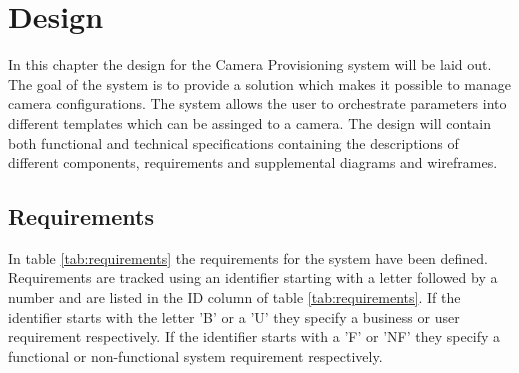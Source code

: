 \chapter{Design}
\label{sec:design}
In this chapter the design for the Camera Provisioning system will be laid out.
The goal of the system is to provide a solution which makes it possible to manage camera configurations.
The system allows the user to orchestrate parameters into different templates which can be assinged to a camera.
The design will contain both functional and technical specifications containing the descriptions of different components, requirements and supplemental diagrams and wireframes.
\section{Requirements}
In table \ref{tab:requirements} the requirements for the system have been defined. Requirements are tracked using an identifier starting with a letter followed by a
number and are listed in the ID column of table \ref{tab:requirements}. If the identifier starts with the letter 'B' or a 'U' they specify a business or user requirement respectively. If the identifier starts with a 'F' or 'NF' they specify a functional or non-functional system requirement respectively.
